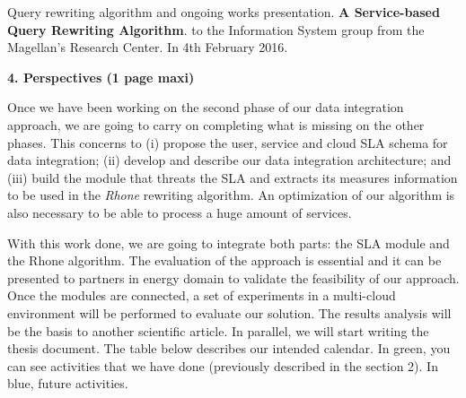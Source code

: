 \documentclass[11pt,a4paper,oneside]{report}
\begin{document}
\noindent
Query rewriting algorithm and ongoing works presentation. \textbf{A Service-based Query Rewriting Algorithm}. to the Information System group from the Magellan’s Research Center. In 4th February 2016.

\newpage
\begin{flushleft}
\textbf{4. Perspectives (1 page maxi)}\\
\end{flushleft}

Once we have been working on the second phase of our data integration approach, we are going to carry on completing what is missing on the other phases. This concerns to (i) propose the user, service and cloud SLA schema for data integration; (ii) develop and describe our data integration architecture; and (iii) build the module that threats the SLA and extracts its measures information to be used in the \textit{Rhone} rewriting algorithm. An optimization of our algorithm is also necessary to be able to process a huge amount of services.

With this work done, we are going to integrate both parts: the SLA module and the Rhone algorithm. The evaluation of the approach is essential and it can be presented to partners in energy domain to validate the feasibility of our approach. Once the modules are connected, a set of experiments in a multi-cloud environment will be performed to evaluate our solution. The results analysis will be the basis to another scientific article. In parallel, we will start writing the thesis document. The table below describes our intended calendar. In green, you can see activities that we have done (previously described in the section 2). In blue, future activities.
\end{document}
